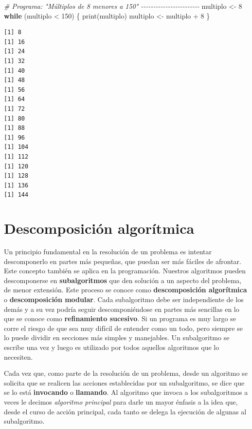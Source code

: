\documentclass[
]{book}
\newenvironment{Shaded}{\begin{snugshade}}{\end{snugshade}}
\newcommand{\CommentTok}[1]{\textcolor[rgb]{0.56,0.35,0.01}{\textit{#1}}}
\newcommand{\ControlFlowTok}[1]{\textcolor[rgb]{0.13,0.29,0.53}{\textbf{#1}}}
\newcommand{\DecValTok}[1]{\textcolor[rgb]{0.00,0.00,0.81}{#1}}
\newcommand{\FunctionTok}[1]{\textcolor[rgb]{0.00,0.00,0.00}{#1}}
\newcommand{\NormalTok}[1]{#1}
\newcommand{\OtherTok}[1]{\textcolor[rgb]{0.56,0.35,0.01}{#1}}
\newcommand{\SpecialCharTok}[1]{\textcolor[rgb]{0.00,0.00,0.00}{#1}}
\begin{document}
\begin{itemize}
\begin{Shaded}
\begin{Highlighting}[]
\CommentTok{\# Programa: "Múltiplos de 8 menores a 150" {-}{-}{-}{-}{-}{-}{-}{-}{-}{-}{-}{-}{-}{-}{-}{-}{-}{-}{-}{-}{-}{-}{-}{-}}
\NormalTok{multiplo }\OtherTok{\textless{}{-}} \DecValTok{8}
\ControlFlowTok{while}\NormalTok{ (multiplo }\SpecialCharTok{\textless{}} \DecValTok{150}\NormalTok{) \{}
    \FunctionTok{print}\NormalTok{(multiplo)}
\NormalTok{    multiplo }\OtherTok{\textless{}{-}}\NormalTok{ multiplo }\SpecialCharTok{+} \DecValTok{8}
\NormalTok{\}}
\end{Highlighting}
\end{Shaded}

\begin{verbatim}
[1] 8
[1] 16
[1] 24
[1] 32
[1] 40
[1] 48
[1] 56
[1] 64
[1] 72
[1] 80
[1] 88
[1] 96
[1] 104
[1] 112
[1] 120
[1] 128
[1] 136
[1] 144
\end{verbatim}
\end{itemize}

\hypertarget{descomposiciuxf3n-algoruxedtmica}{%
\chapter{Descomposición algorítmica}\label{descomposiciuxf3n-algoruxedtmica}}

Un principio fundamental en la resolución de un problema es intentar descomponerlo en partes más pequeñas, que puedan ser más fáciles de afrontar. Este concepto también se aplica en la programación. Nuestros algoritmos pueden descomponerse en \textbf{subalgoritmos} que den solución a un aspecto del problema, de menor extensión. Este proceso se conoce como \textbf{descomposición algorítmica} o \textbf{descomposición modular}. Cada subalgoritmo debe ser independiente de los demás y a su vez podría seguir descomponiéndose en partes más sencillas en lo que se conoce como \textbf{refinamiento sucesivo}. Si un programa es muy largo se corre el riesgo de que sea muy difícil de entender como un todo, pero siempre se lo puede dividir en secciones más simples y manejables. Un subalgoritmo se escribe una vez y luego es utilizado por todos aquellos algoritmos que lo necesiten.

Cada vez que, como parte de la resolución de un problema, desde un algoritmo se solicita que se realicen las acciones establecidas por un subalgoritmo, se dice que se lo está \textbf{invocando} o \textbf{llamando}. Al algoritmo que invoca a los subalgoritmos a veces le decimos \emph{algoritmo principal} para darle un mayor énfasis a la idea que, desde el curso de acción principal, cada tanto se delega la ejecución de algunas al subalgoritmo.
\end{document}
